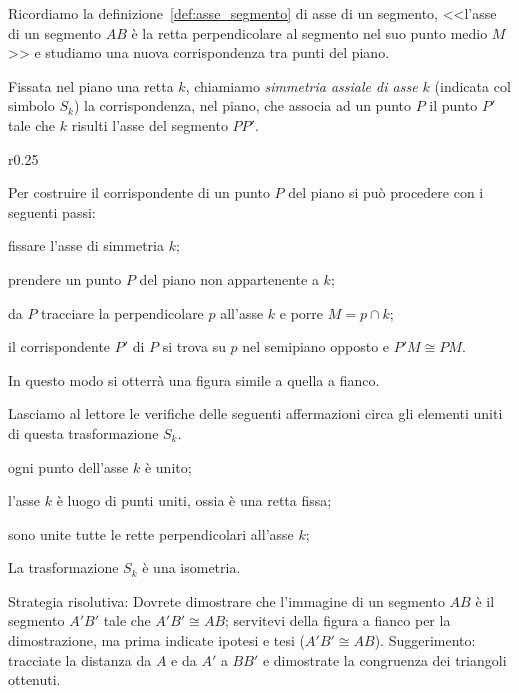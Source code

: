 Ricordiamo la definizione~\ref{def:asse_segmento} di asse di un segmento, <<l'asse di un segmento $AB$ è la retta perpendicolare al segmento nel suo punto medio $M$>> e studiamo una nuova corrispondenza tra punti del piano.

\begin{definizione}
Fissata nel piano una retta $k$, chiamiamo \emph{simmetria assiale di asse $k$} (indicata col simbolo $S_k$) la corrispondenza, nel piano, che associa ad un punto $P$ il punto $P'$ tale che $k$ risulti l'asse del segmento $PP'$.
\end{definizione}

\setlength{\intextsep}{3pt plus 2.0pt minus 2.0pt}
\begin{wrapfigure}{r}{0.25\textwidth}
	\centering
\end{wrapfigure}
Per costruire il corrispondente di un punto $P$ del piano si può procedere con i seguenti passi:
\begin{enumerate*}
\item fissare l'asse di simmetria $k$;
\item prendere un punto $P$ del piano non appartenente a $k$;
\item da $P$ tracciare la perpendicolare $p$ all'asse $k$ e porre $M=p\cap k$;
\item il corrispondente $P'$ di $P$ si trova su $p$ nel semipiano opposto e $P'M\cong PM$.
\end{enumerate*}

In questo modo si otterrà una figura simile a quella a fianco.

Lasciamo al lettore le verifiche delle seguenti affermazioni circa gli elementi uniti di questa trasformazione $S_k$.
\begin{itemize*}
\item ogni punto dell'asse $k$ è unito;
\item l'asse $k$ è luogo di punti uniti, ossia è una retta fissa;
\item sono unite tutte le rette perpendicolari all'asse $k$;
\end{itemize*}
\setlength{\intextsep}{\defintextsep}

\begin{teorema}\label{teo:8.3}
La trasformazione $S_k$ è una isometria.
\end{teorema}

\noindent\begin{minipage}{0.65\textwidth}\parindent15pt
Strategia risolutiva:
Dovrete dimostrare che l'immagine di un segmento $AB$ è il segmento $A'B'$ tale che $A'B'\cong AB$; servitevi della figura a fianco per la dimostrazione, ma prima indicate ipotesi e tesi ($A'B'\cong AB$).
Suggerimento: tracciate la distanza da $A$ e da $A'$ a $BB'$ e dimostrate la congruenza dei triangoli ottenuti.
\end{minipage}\hfil
\begin{minipage}{0.35\textwidth}
	\centering
\end{minipage}\vspace{5pt}

